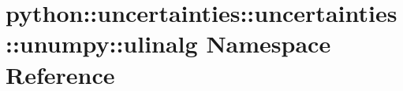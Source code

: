 \hypertarget{namespacepython_1_1uncertainties_1_1uncertainties_1_1unumpy_1_1ulinalg}{
\section{python::uncertainties::uncertainties::unumpy::ulinalg Namespace Reference}
\label{namespacepython_1_1uncertainties_1_1uncertainties_1_1unumpy_1_1ulinalg}
}
